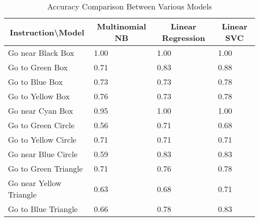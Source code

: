\begin{table}[h]
    \centering
    \begin{tabular}{|l|l|l|l|}
        \hline
        \multicolumn{1}{|c|}{Instruction\textbackslash{}Model} & \multicolumn{1}{c|}{Multinomial NB} & \multicolumn{1}{c|}{Linear Regression} & \multicolumn{1}{c|}{Linear SVC} \\ \hline
        Go near Black Box                                         & 1.00                                & 1.00                                   & 1.00                            \\ \hline
        Go to Green Box                                         & 0.71                                & 0.83                                   & 0.88                            \\ \hline
        Go to Blue Box                                          & 0.73                                & 0.73                                   & 0.78                            \\ \hline
        Go to Yellow Box                                        & 0.76                                & 0.73                                   & 0.78                            \\ \hline
        Go near Cyan Box                                          & 0.95                                & 1.00                                   & 1.00                            \\ \hline
        Go to Green Circle                                      & 0.56                                & 0.71                                   & 0.68                            \\ \hline
        Go to Yellow Circle                                     & 0.71                                & 0.71                                   & 0.71                            \\ \hline
        Go near Blue Circle                                       & 0.59                                & 0.83                                   & 0.83                            \\ \hline
        Go to Green Triangle                                    & 0.71                                & 0.76                                   & 0.78                            \\ \hline
        Go near Yellow Triangle                                   & 0.63                                & 0.68                                   & 0.71                            \\ \hline
        Go to Blue Triangle                                     & 0.66                                & 0.78                                   & 0.83                            \\ \hline
    \end{tabular}
    \caption{Accuracy Comparison Between Various Models}
\end{table}

